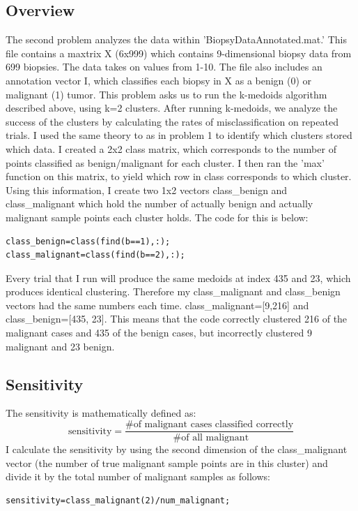 \documentclass{article}
\begin{document}
\subsection*{Overview}
The second problem analyzes the data within 'BiopsyDataAnnotated.mat.'  This file contains a maxtrix X (6x999) which contains 9-dimensional biopsy data from 699 biopsies.  The data takes on values from 1-10.  The file also includes an annotation vector I, which classifies each biopsy in X as a benign (0) or malignant (1) tumor.  This problem asks us to run the k-medoids algorithm described above, using k=2 clusters.  After running k-medoids, we analyze the success of the clusters by calculating the rates of misclassification on repeated trials.  I used the same theory to as in problem 1 to identify which clusters stored which data.  I created a 2x2 class matrix, which corresponds to the number of points classified as benign/malignant for each cluster.  I then ran the 'max' function on this matrix, to yield which row in class corresponds to which cluster.  Using this information, I create two 1x2 vectors class\_benign and class\_malignant which hold the number of actually benign and actually malignant sample points each cluster holds.  The code for this is below:\\
\begin{verbatim}class_benign=class(find(b==1),:);
class_malignant=class(find(b==2),:);\end{verbatim}

Every trial that I run will produce the same medoids at index 435 and 23, which produces identical clustering.  Therefore my class\_malignant and class\_benign vectors had the same numbers each time.  class\_malignant=[9,216] and class\_benign=[435, 23].  This means that the code correctly clustered 216 of the malignant cases and 435 of the benign cases, but incorrectly clustered 9 malignant and 23 benign.

\subsection*{Sensitivity}
The sensitivity is mathematically defined as:
\[
\text{sensitivity} = \frac{\text{\# of malignant cases classified correctly}}{\text{ \# of all malignant}}
\]
I calculate the sensitivity by using the second dimension of the class\_malignant vector (the number of true malignant sample points are in this cluster) and divide it by the total number of malignant samples as follows:
\begin{verbatim}
sensitivity=class_malignant(2)/num_malignant;
\end{verbatim}
\end{document}
